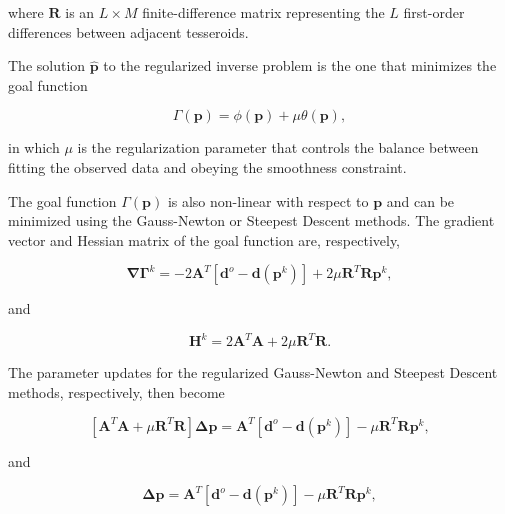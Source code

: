 \documentclass[extra]{gji}
\begin{document}
\noindent where $\mathbf{R}$ is an $L \times M$ finite-difference matrix
representing the $L$ first-order differences between adjacent tesseroids.

The solution $\hat{\mathbf{p}}$ to the regularized inverse problem is the one that
minimizes the goal function

\begin{equation}
    \Gamma(\mathbf{p}) = \phi(\mathbf{p}) + \mu\theta(\mathbf{p}),
    \label{eq:goalfunction}
\end{equation}

\noindent
in which $\mu$ is the regularization parameter that controls the balance
between fitting the observed data and obeying the smoothness constraint.

The goal function $\Gamma(\mathbf{p})$ is also non-linear with respect to
$\mathbf{p}$ and can be minimized using the Gauss-Newton or Steepest Descent
methods.
The gradient vector and Hessian matrix of the goal function are, respectively,

\begin{equation}
    \mathbf{\nabla\Gamma}^k =
        -2\mathbf{A}^T[\mathbf{d}^o - \mathbf{d}(\mathbf{p}^k)] +
        2\mu\mathbf{R}^T\mathbf{R}\mathbf{p}^k,
    \label{eq:gradient-regul}
\end{equation}

\noindent and

\begin{equation}
    \mathbf{H}^k = 2\mathbf{A}^T\mathbf{A} + 2\mu\mathbf{R}^T\mathbf{R}.
    \label{eq:hessian-regul}
\end{equation}

\noindent The parameter updates for the regularized Gauss-Newton and Steepest
Descent methods, respectively, then become

\begin{equation}
    \left[\mathbf{A}^T\mathbf{A} + \mu\mathbf{R}^T\mathbf{R}\right]
    \mathbf{\Delta p} =
        \mathbf{A}^T[\mathbf{d}^o - \mathbf{d}(\mathbf{p}^k)] -
        \mu\mathbf{R}^T\mathbf{R}\mathbf{p}^k,
    \label{eq:gaussnewton-regul}
\end{equation}

\noindent and

\begin{equation}
    \mathbf{\Delta p} =
        \mathbf{A}^T[\mathbf{d}^o - \mathbf{d}(\mathbf{p}^k)] -
        \mu\mathbf{R}^T\mathbf{R}\mathbf{p}^k,
    \label{eq:steepest-regul}
\end{equation}
\end{document}
